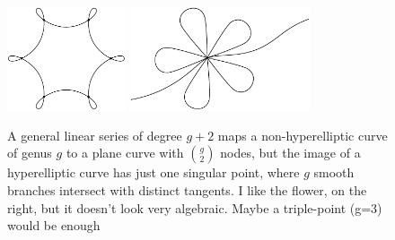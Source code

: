 \begin{figure}
\centerline {\includegraphics[height=1.2in]{"main/Fig09-4A"}
\hfil
\includegraphics[height=1.2in]{"main/Fig09-4B"}}
\caption{A general linear series of degree $g+2$ maps a non-hyperelliptic curve of genus $g$
to a plane curve with $\binom{g}{2}$ nodes, but the image of a hyperelliptic curve has
just one singular point, where $g$ smooth branches intersect with distinct tangents.
I like the flower, on the right, but it doesn't look very algebraic. Maybe a triple-point (g=3) would be enough}
\label{Fig9.1}
\end{figure}

